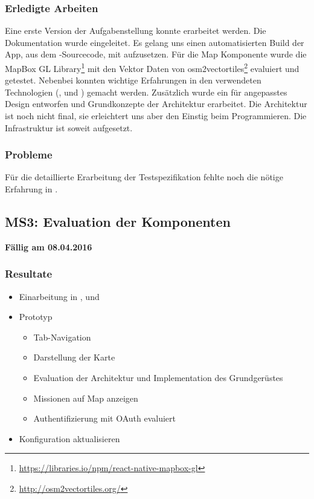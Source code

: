 \subsubsection{Erledigte Arbeiten}
Eine erste Version der Aufgabenstellung konnte erarbeitet werden. 
Die Dokumentation wurde eingeleitet.
Es gelang uns einen automatisierten Build der App, aus dem -Sourcecode, mit  aufzusetzen.
Für die Map Komponente wurde die MapBox GL \gls{Library}\footnote{\url{https://libraries.io/npm/react-native-mapbox-gl}} mit den Vektor Daten von osm2vectortiles\footnote{\url{http://osm2vectortiles.org/}} evaluiert und getestet.
Nebenbei konnten wichtige Erfahrungen in den verwendeten Technologien (,  und ) gemacht werden.
Zusätzlich wurde ein für  angepasstes Design entworfen und Grundkonzepte der Architektur erarbeitet.
Die Architektur ist noch nicht final, sie erleichtert uns aber den Einstig beim Programmieren.
Die Infrastruktur ist soweit aufgesetzt.

\subsubsection{Probleme}
Für die detaillierte Erarbeitung der Testspezifikation fehlte noch die nötige Erfahrung in .


\subsection{MS3: Evaluation der Komponenten}
\label{pm-ms3}
\textbf{Fällig am 08.04.2016}
\subsubsection{Resultate}
\begin{itemize}
	\item Einarbeitung in ,  und 
	\item {} Prototyp
	\begin{itemize}
		\item Tab-Navigation
		\item Darstellung der Karte
		\item Evaluation der Architektur und Implementation des Grundgerüstes
		\item Missionen auf Map anzeigen
		\item Authentifizierung mit \gls{OAuth} evaluiert
	\end{itemize}
	\item {} Konfiguration aktualisieren
\end{itemize}

